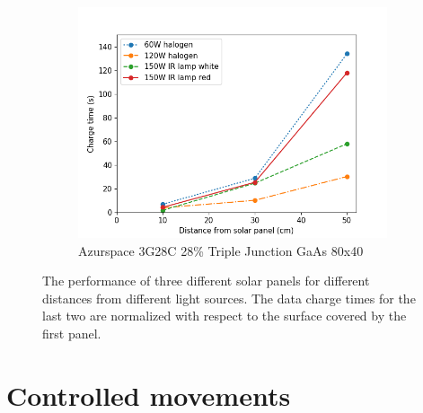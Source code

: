 \begin{figure}
	\begin{subfigure}[b]{0.60\textwidth}
		\includegraphics[width=\textwidth]{pics/light_experiment_figure3.png}
		\caption{Azurspace 3G28C 28\% Triple Junction GaAs 80x40}
		\label{fig:light_exp3}
	\end{subfigure}
	\caption{The performance of three different solar panels for different distances from different light sources. The data charge times for the last two are normalized with respect to the surface covered by the first panel.}
\end{figure}



\section{Controlled movements}





